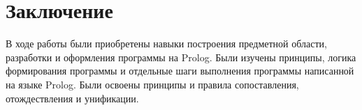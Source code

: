 {\large\section*{Заключение}}

В ходе работы были приобретены навыки построения предметной области, разработки и оформления программы на Prolog. Были изучены принципы, логика формирования программы и отдельные шаги выполнения программы написанной на языке Prolog. Были освоены принципы и правила сопоставления, отождествления и унификации.
